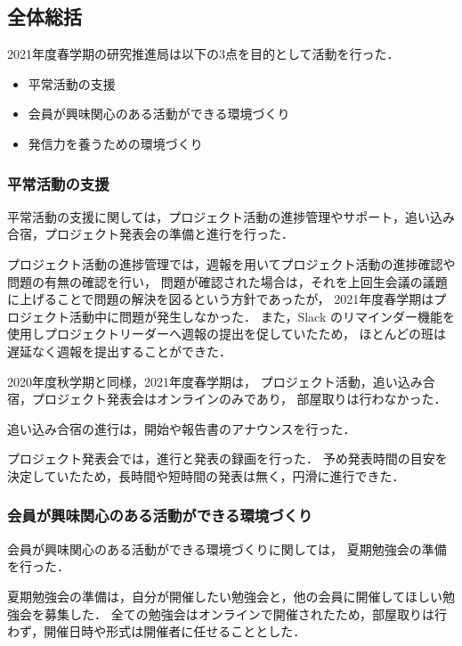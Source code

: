 \subsection*{全体総括}



2021年度春学期の研究推進局は以下の3点を目的として活動を行った．

\begin{itemize}
    \item 平常活動の支援
    \item 会員が興味関心のある活動ができる環境づくり
    \item 発信力を養うための環境づくり
\end{itemize}

\subsubsection*{平常活動の支援}
平常活動の支援に関しては，プロジェクト活動の進捗管理やサポート，追い込み合宿，プロジェクト発表会の準備と進行を行った．

プロジェクト活動の進捗管理では，週報を用いてプロジェクト活動の進捗確認や問題の有無の確認を行い，
問題が確認された場合は，それを上回生会議の議題に上げることで問題の解決を図るという方針であったが，
2021年度春学期はプロジェクト活動中に問題が発生しなかった．
また，Slack のリマインダー機能を使用しプロジェクトリーダーへ週報の提出を促していたため，
ほとんどの班は遅延なく週報を提出することができた．

2020年度秋学期と同様，2021年度春学期は，
プロジェクト活動，追い込み合宿，プロジェクト発表会はオンラインのみであり，
部屋取りは行わなかった．

追い込み合宿の進行は，開始や報告書のアナウンスを行った．

プロジェクト発表会では，進行と発表の録画を行った．
予め発表時間の目安を決定していたため，長時間や短時間の発表は無く，円滑に進行できた．

\subsubsection*{会員が興味関心のある活動ができる環境づくり}
会員が興味関心のある活動ができる環境づくりに関しては，
夏期勉強会の準備を行った．

夏期勉強会の準備は，自分が開催したい勉強会と，他の会員に開催してほしい勉強会を募集した．
全ての勉強会はオンラインで開催されたため，部屋取りは行わず，開催日時や形式は開催者に任せることとした．

